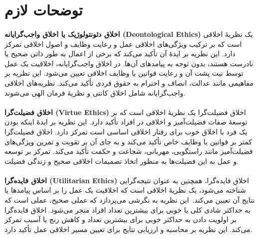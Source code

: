 
\section*{توضحات لازم}
\label{sec:توضحات لازم}

\paragraph{}
\textbf{اخلاق دئونتولوژیک یا اخلاق واجب‌گرایانه \textenglish{\textbf{(Deontological Ethics)}}}
یک نظریهٔ اخلاقی است که بر ترکیب ویژگی‌های اخلاقی عمل و رعایت وظایف و اصول اخلاقی تمرکز دارد.
این نظریه بر ایدهٔ آن تأکید می‌کند که برخی از اعمال به طور ذاتی صحیح یا نادرست هستند، بدون توجه به پیامدهای آن‌ها.
در اخلاق واجب‌گرایانه، اخلاقیت یک عمل توسط نیت پشت آن و رعایت قوانین یا وظایف اخلاقی تعیین می‌شود.
این نظریه بر مفاهیمی مانند عدالت، انصاف و احترام به حقوق فردی تأکید می‌کند.
نظریه‌های اخلاقی واجب‌گرایانه شامل اخلاق کانتی و نظریهٔ فرمان الهی می‌شوند.

\paragraph{}
\textbf{اخلاق فضیلت‌گرا \textenglish{\textbf{(Virtue Ethics)}}}
اخلاق فضیلت‌گرا یک نظریهٔ اخلاقی است که بر توسعهٔ صفات فضیلت‌آمیز و اخلاقی در افراد تأکید دارد.
این نظریه بر ایدهٔ اینکه بودن یک فرد با اخلاق خوب برای رفتار اخلاقی اساسی است تمرکز دارد.
اخلاق فضیلت‌گرا کمتر بر قوانین یا وظایف خاص تأکید می‌کند و به جای آن بر تقویت و تمرین ویژگی‌های فضیلت‌آمیز مانند راستگویی، مهربانی، شجاعت و حکمت تأکید می‌کند.
تمرکز بر توسعه و عمل به این فضیلت‌ها به منظور اتخاذ تصمیمات اخلاقی صحیح و زندگی فضیلت.

\paragraph{}
\textbf{اخلاق فایده‌گرا \textenglish{\textbf{(Utilitarian Ethics)}}}
اخلاق فایده‌گرا، همچنین به عنوان نتیجه‌گرایی شناخته می‌شود، یک نظریهٔ اخلاقی است که اخلاقیت یک عمل را بر اساس پیامدها یا نتایج آن تعیین می‌کند.\     این نظریه به نگرشی می‌پردازد که عملی صحیح، عملی است که به حداکثر شادی کلی یا خوبی برای بیشترین تعداد افراد منجر می‌شود.
اخلاق فایده‌گرا بر اولویت دادن به حداکثر خوبی برای بیشترین تعداد و کاهش رنج یا آسیب تمرکز می‌کند.
این نظریه بر محاسبه و ارزیابی نتایج برای تعیین مسیر اخلاقی عمل تأکید دارد.


\newpage


